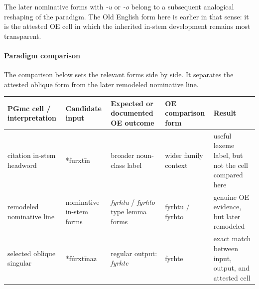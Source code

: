 \documentclass[
  british,
  a4paper,
]{article}
\newcounter{none} %
\begin{document}
The later nominative forms with \emph{-u} or \emph{-o} belong to a
subsequent analogical reshaping of the paradigm. The Old English form
here is earlier in that sense: it is the attested OE cell in which the
inherited in-stem development remains most transparent.

\paragraph{Paradigm comparison}\label{paradigm-comparison-5}

The comparison below sets the relevant forms side by side. It separates
the attested oblique form from the later remodeled nominative line.

{\def\LTcaptype{none} %
\begin{longtable}[]{@{}
  >{\raggedright\arraybackslash}p{}
  >{\raggedright\arraybackslash}p{}
  >{\raggedright\arraybackslash}p{}
  >{\raggedright\arraybackslash}p{}
  >{\raggedright\arraybackslash}p{}@{}}
\toprule\noalign{}
\begin{minipage}[b]{\linewidth}\raggedright
PGmc cell / interpretation
\end{minipage} & \begin{minipage}[b]{\linewidth}\raggedright
Candidate input
\end{minipage} & \begin{minipage}[b]{\linewidth}\raggedright
Expected or documented OE outcome
\end{minipage} & \begin{minipage}[b]{\linewidth}\raggedright
OE comparison form
\end{minipage} & \begin{minipage}[b]{\linewidth}\raggedright
Result
\end{minipage} \\
\midrule\noalign{}
\endhead
\bottomrule\noalign{}
\endlastfoot
citation in-stem headword & *furxtīn & broader noun-class label & wider
family context & useful lexeme label, but not the cell compared here \\
remodeled nominative line & nominative in-stem forms & \emph{fyrhtu} /
\emph{fyrhto} type lemma forms & fyrhtu / fyrhto & genuine OE evidence,
but later remodeled \\
selected oblique singular & *fúrxtīnaz & regular output: \emph{fyrhte} &
fyrhte & exact match between input, output, and attested cell \\
\end{longtable}
}
\end{document}
